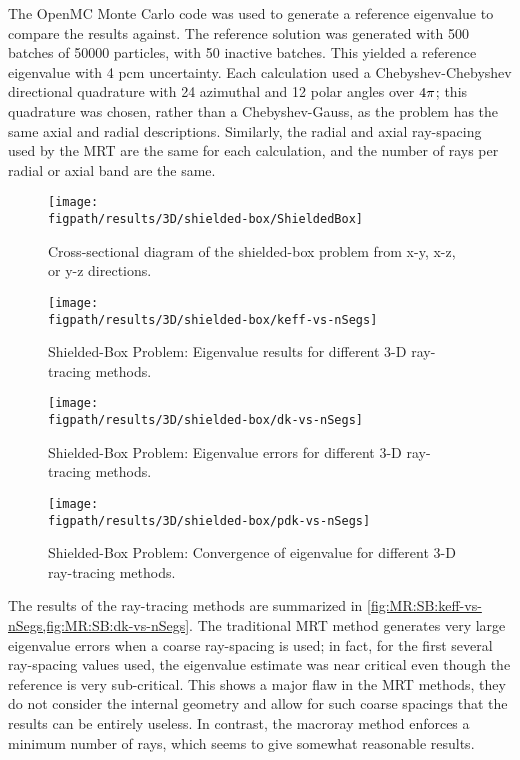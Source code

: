 {{{      The OpenMC Monte Carlo code \cite{OpenMC} was used to generate a reference eigenvalue to compare the results against.
      The reference solution was generated with 500 batches of 50000 particles, with 50 inactive batches.
      This yielded a reference eigenvalue with 4 pcm uncertainty.
      Each calculation used a Chebyshev-Chebyshev directional quadrature with 24 azimuthal and 12 polar angles over $4\pi$;
        this quadrature was chosen, rather than a Chebyshev-Gauss, as the problem has the same axial and radial descriptions.
      Similarly, the radial and axial ray-spacing used by the \ac{MRT} are the same for each calculation, and the number of rays per radial or axial band are the same.

      \begin{figure}[h]
        \centering
        \texttt{[image: \\figpath/results/3D/shielded-box/ShieldedBox]}
        \caption{Cross-sectional diagram of the shielded-box problem from x-y, x-z, or y-z directions. \label{fig:MR:Shielded-Box Diagram}}
      \end{figure}

      \begin{figure}[hp]
        \centering
        \texttt{[image: \\figpath/results/3D/shielded-box/keff-vs-nSegs]}
        \caption{Shielded-Box Problem: Eigenvalue results for different 3-D ray-tracing methods. \label{fig:MR:SB:keff-vs-nSegs}}
      \end{figure}
      \begin{figure}[hp]
        \centering
        \texttt{[image: \\figpath/results/3D/shielded-box/dk-vs-nSegs]}
        \caption{Shielded-Box Problem: Eigenvalue errors for different 3-D ray-tracing methods. \label{fig:MR:SB:dk-vs-nSegs}}
      \end{figure}
      \begin{figure}[hp]
        \centering
        \texttt{[image: \\figpath/results/3D/shielded-box/pdk-vs-nSegs]}
        \caption{Shielded-Box Problem: Convergence of eigenvalue for different 3-D ray-tracing methods. \label{fig:MR:SB:pdk-vs-nSegs}}
      \end{figure}

      The results of the ray-tracing methods are summarized in \cref{fig:MR:SB:keff-vs-nSegs,fig:MR:SB:dk-vs-nSegs}.
      The traditional \ac{MRT} method generates very large eigenvalue errors when a coarse ray-spacing is used;
        in fact, for the first several ray-spacing values used, the eigenvalue estimate was near critical even though the reference is very sub-critical.
      This shows a major flaw in the \ac{MRT} methods, they do not consider the internal geometry and allow for such coarse spacings that the results can be entirely useless.
      In contrast, the macroray method enforces a minimum number of rays, which seems to give somewhat reasonable results.

}}}
